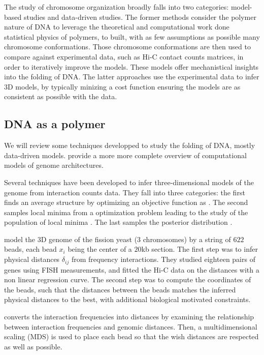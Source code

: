 The study of chromosome organization broadly falls into two categories:
model-based studies and data-driven studies. The former methods consider the
polymer nature of DNA to leverage the theoretical and computational work done
statistical physics of polymers, to built, with as few assumptions as
possible many chromosome conformations. Those chromosome conformations
are then used to compare against experimental data, such as Hi-C contact
counts matrices, in order to iteratively improve the models. These models
offer mechanistical insights into the folding of DNA. The latter approaches
use the experimental data to infer 3D models, by typically minizing a cost
function ensuring the models are as consistent as possible with the data.

\subsection{DNA as a polymer}

We will review some techniques developped to study the folding of DNA, mostly
data-driven models. \citet{rosa:computational} provide a more more complete
overview of computational models of genome architectures.

Several techniques have been developed to infer three-dimensional models of
the genome from interaction counts data. They fall into three categories: the
first finds an average structure by optimizing an objective function as
\citep{tanizawa:mapping, duan:three, ben-elazar:spatial}. The
second samples local minima from a optimization problem leading to the study
of the population of local minima \citep{bau:three-dimensional}. The last
samples the posterior distribution \citep{rousseau:three}.

\citet{tanizawa:mapping} model the 3D genome of the fission yeast (3
chromosomes) by a string of $622$ beads, each bead $x_i$ being the center of a
$20$kb section. The first step was to infer physical distances $\delta_{ij}$
from frequency interactions. They studied eighteen pairs of genes using FISH
measurements, and fitted the Hi-C data on the distances with a non linear
regression curve. The second step was to compute the coordinates of the beads,
such that the distances between the beads matches the inferred physical
distances to the best, with additional biological motivated constraints.

\citet{duan:three} converts the interaction frequencies into distances by
examining the relationship between interaction frequencies and genomic
distances. Then, a multidimensional scaling (MDS) is used to place each bead
so that the wish distances are respected as well as possible.

